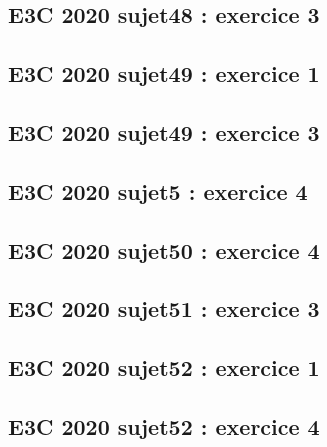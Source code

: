 \documentclass[lang=fr,edition=teacher,layout=sheet]{mxbook}
\begin{document}
\subsection*{E3C 2020 sujet48 : exercice 3}
\begingroup\endgroup
\par\bigskip
{}\subsection*{E3C 2020 sujet49 : exercice 1}
\begingroup\endgroup
\par\bigskip
{}\subsection*{E3C 2020 sujet49 : exercice 3}
\begingroup\endgroup
\par\bigskip
{}\subsection*{E3C 2020 sujet5 : exercice 4}
\begingroup\endgroup
\par\bigskip
{}\subsection*{E3C 2020 sujet50 : exercice 4}
\begingroup\endgroup
\par\bigskip
{}\subsection*{E3C 2020 sujet51 : exercice 3}
\begingroup\endgroup
\par\bigskip
{}\subsection*{E3C 2020 sujet52 : exercice 1}
\begingroup\endgroup
\par\bigskip
{}\subsection*{E3C 2020 sujet52 : exercice 4}
\end{document}
